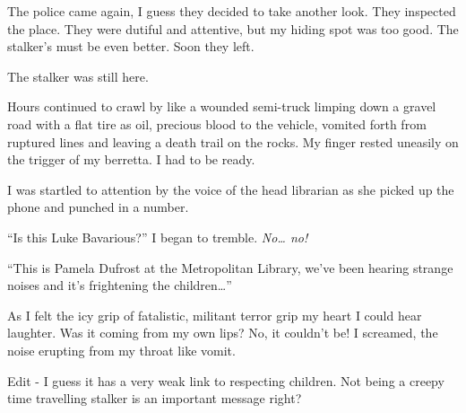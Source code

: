 The police came again, I guess they decided to take another look.
They inspected the place. They were dutiful and attentive, but my
hiding spot was too good. The stalker's must be even better. Soon
they left.



The stalker was still here.



Hours continued to crawl by like a wounded semi-truck limping down
a gravel road with a flat tire as oil, precious blood to the
vehicle, vomited forth from ruptured lines and leaving a death
trail on the rocks. My finger rested uneasily on the trigger of my
berretta. I had to be ready.



I was startled to attention by the voice of the head librarian as
she picked up the phone and punched in a number.



``Is this Luke Bavarious?'' I began to tremble. {\em No{\ldots}
no!}



``This is Pamela Dufrost at the Metropolitan Library, we've been
hearing strange noises and it's frightening the
children{\ldots}''



As I felt the icy grip of fatalistic, militant terror grip my heart
I could hear laughter. Was it coming from my own lips? No, it
couldn't be! I screamed, the noise erupting from my throat
like vomit.





Edit - I guess it has a very weak link to respecting children. Not
being a creepy time travelling stalker is an important message
right? 
 



